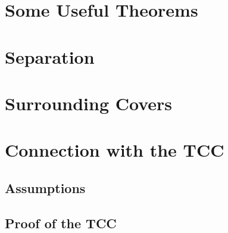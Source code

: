 \documentclass[12pt]{article}
\begin{document}

\section{Some Useful Theorems}


\section{Separation}


\section{Surrounding Covers}





\section{Connection with the TCC}

\subsection{Assumptions}


\subsection{Proof of the TCC}

\end{document}
